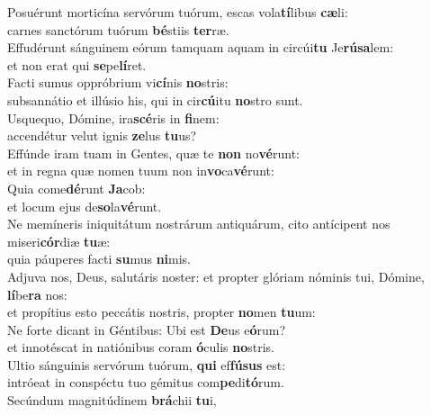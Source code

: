 \evenverse Posuérunt morticína servórum tuórum, escas vola\textbf{tí}libus \textbf{cæ}li:~\*\\
\evenverse carnes sanctórum tuórum \textbf{bé}stiis \textbf{ter}ræ.\\
\oddverse Effudérunt sánguinem eórum tamquam aquam in circúi\textbf{tu} Je\textbf{rú}\textbf{sa}lem:~\*\\
\oddverse et non erat qui \textbf{se}pe\textbf{lí}ret.\\
\evenverse Facti sumus oppróbrium vi\textbf{cí}nis \textbf{no}stris:~\*\\
\evenverse subsannátio et illúsio his, qui in cir\textbf{cú}itu \textbf{no}stro sunt.\\
\oddverse Usquequo, Dómine, ira\textbf{scé}ris in \textbf{fi}nem:~\*\\
\oddverse accendétur velut ignis \textbf{ze}lus \textbf{tu}us?\\
\evenverse Effúnde iram tuam in Gentes, quæ te \textbf{non} no\textbf{vé}runt:~\*\\
\evenverse et in regna quæ nomen tuum non in\textbf{vo}ca\textbf{vé}runt:\\
\oddverse Quia come\textbf{dé}runt \textbf{Ja}cob:~\*\\
\oddverse et locum ejus de\textbf{so}la\textbf{vé}runt.\\
\evenverse Ne memíneris iniquitátum nostrárum antiquárum, cito antícipent nos miseri\textbf{cór}diæ \textbf{tu}æ:~\*\\
\evenverse quia páuperes facti \textbf{su}mus \textbf{ni}mis.\\
\oddverse Adjuva nos, Deus, salutáris noster: et propter glóriam nóminis tui, Dómine, \textbf{lí}be\textbf{ra} nos:~\*\\
\oddverse et propítius esto peccátis nostris, propter \textbf{no}men \textbf{tu}um:\\
\evenverse Ne forte dicant in Géntibus: Ubi est \textbf{De}us e\textbf{ó}rum?~\*\\
\evenverse et innotéscat in natiónibus coram \textbf{ó}culis \textbf{no}stris.\\
\oddverse Ultio sánguinis servórum tuórum, \textbf{qui} ef\textbf{fú}\textbf{sus} est:~\*\\
\oddverse intróeat in conspéctu tuo gémitus com\textbf{pe}di\textbf{tó}rum.\\
\evenverse Secúndum magnitúdinem \textbf{brá}chii \textbf{tu}i,~\*\\
